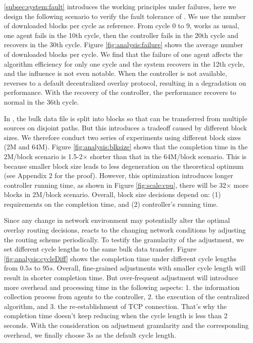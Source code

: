 \label{subsubsec:evaluation:adaptability}

 \Section\ref{subsec:system:fault} introduces the working principles under failures, here we design the following scenario to verify the fault tolerance of \name. We use the number of downloaded blocks per cycle as reference. From cycle 0 to 9, \name works as usual, one agent fails in the 10th cycle, then the controller fails in the 20th cycle and recovers in the 30th cycle. Figure \ref{fig:analysis:failure} shows the average number of downloaded blocks per cycle. We find that the failure of one agent affects the algorithm efficiency for only one cycle and the system recovers in the 12th cycle, and the influence is not even notable. When the controller is not available, \name reverses to a default decentralized overlay protocol, resulting in a degradation on performance. With the recovery of the controller, the performance recovers to normal in the 36th cycle.

 In \name, the bulk data file is split into blocks so that can be transferred from multiple sources on disjoint paths. But this introduces a tradeoff caused by different block sizes. We therefore conduct two series of experiments using different block sizes (2M and 64M). Figure \ref{fig:analysis:blksize} shows that the completion time in the 2M/block scenario is 1.5-2$\times$ shorter than that in the 64M/block scenario. This is because smaller block size leads to less degeneration on the theoretical optimum (see Appendix 2 for the proof). However, this optimization introduces longer controller running time, as shown in Figure \ref{fig:scale:cpu}, there will be 32$\times$ more blocks in 2M/block scenario. Overall, block size decisions depend on: (1) requirements on the completion time, and (2) controller's running time.

 Since any change in network environment may potentially alter the optimal overlay routing decisions, \name reacts to the changing network conditions by adjusting the routing scheme periodically. To testify the granularity of the adjustment, we set different cycle lengths to the same bulk data transfer. Figure \ref{fig:analysis:cycleDiff} shows the completion time under different cycle lengths from $0.5s$ to $95s$. Overall, fine-grained adjustments with smaller cycle length will result in shorter completion time. But over-frequent adjustment will introduce more overhead and processing time in the following aspects: 1. the information collection process from agents to the controller, 2. the execution of the centralized algorithm, and 3. the re-establishment of TCP connection. That's why the completion time doesn't keep reducing when the cycle length is less than 2 seconds. With the consideration on adjustment granularity and the corresponding overhead, we finally choose $3s$ as the default cycle length.


